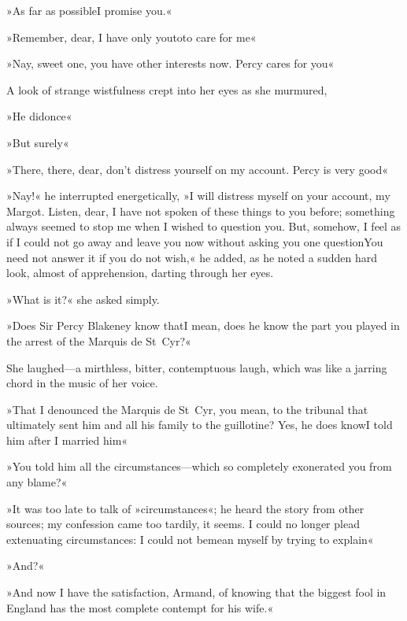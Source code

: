 »As far as possible\textellipsis \allowbreak  I promise you.«

»Remember, dear, I have only you\textellipsis \allowbreak  to\textellipsis \allowbreak  to care for me\textellipsis«

»Nay, sweet one, you have other interests now. Percy cares for you\textellipsis«

A look of strange wistfulness crept into her eyes as she murmured,\longdash


»He did\textellipsis \allowbreak  once\textellipsis«

»But surely\textellipsis«

»There, there, dear, don't distress yourself on my account. Percy is very good\textellipsis«

»Nay!« he interrupted energetically, »I will distress myself on your account, my Margot. Listen, dear, I have not spoken of these things to you before; something always seemed to stop me when I wished to question you. But, somehow, I feel as if I could not go away and leave you now without asking you one question\textellipsis \allowbreak  You need not answer it if you do not wish,« he added, as he noted a sudden hard look, almost of apprehension, darting through her eyes.

»What is it?« she asked simply.

»Does Sir Percy Blakeney know that\textellipsis \allowbreak  I mean, does he know the part you played in the arrest of the Marquis de St~Cyr?«

She laughed—a mirthless, bitter, contemptuous laugh, which was like a jarring chord in the music of her voice.

»That I denounced the Marquis de St~Cyr, you mean, to the tribunal that ultimately sent him and all his family to the guillotine? Yes, he does know\textellipsis \allowbreak  I told him after I married him\textellipsis«

»You told him all the circumstances—which so completely exonerated you from any blame?«

»It was too late to talk of »circumstances«; he heard the story from other sources; my confession came too tardily, it seems. I could no longer plead extenuating circumstances: I could not bemean myself by trying to explain\longdash«

»And?«

»And now I have the satisfaction, Armand, of knowing that the biggest fool in England has the most complete contempt for his wife.«


